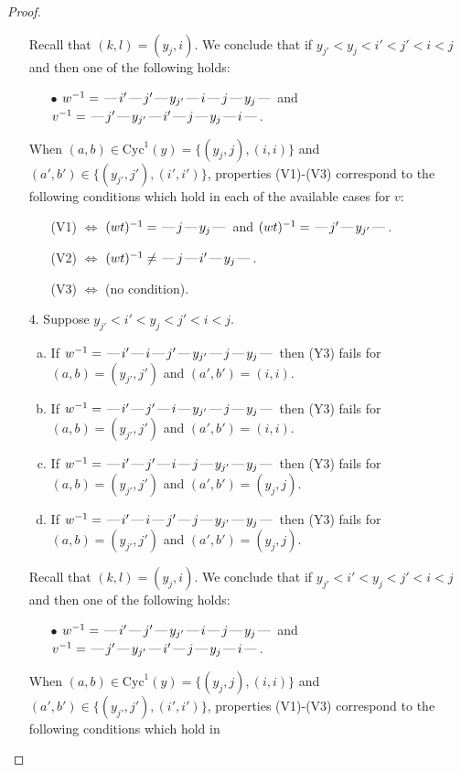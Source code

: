 \documentclass[10pt]{article}
\theoremstyle{definition}
\theoremstyle{definition}
\def\dash{\text{\hspace{0.5mm}---\hspace{0.5mm}}}
\def\Cyc{\mathrm{Cyc}}
\begin{document}
\begin{proof}
\begin{enumerate}
Recall that $(k,l) = (y_j,i)$.
We conclude that if $y_{j'} < y_j < i' < j' < i < j$ and then one of the following holds:
\begin{enumerate}
\item[$\bullet$] $w^{-1} = \dash i'\dash j'\dash y_{j'}\dash i\dash j\dash y_j\dash $ and $v^{-1} = \dash j'\dash y_{j'}\dash i'\dash j\dash y_j\dash i\dash $.
\end{enumerate}
When $(a,b)\in\Cyc^1(y)=\{(y_j,j),(i,i)\}$ and $(a',b')\in\{(y_{j'},j'),(i',i')\}$,
properties (V1)-(V3) correspond to the following conditions which hold in
each of the available cases for $v$:
\begin{enumerate}
\item[](V1) $\Leftrightarrow$ $(wt)^{-1} = \dash j \dash y_j \dash$  and $(wt)^{-1} = \dash j' \dash y_{j'} \dash$.
\item[](V2) $\Leftrightarrow$ $(wt)^{-1} \neq \dash j \dash i' \dash y_j \dash$.
\item[](V3) $\Leftrightarrow$ (no condition).
\end{enumerate}
\item[$4$.] Suppose $y_{j'} < i' < y_j < j' < i < j$.
\begin{enumerate}[(a)]
\item If $w^{-1} = \dash i'\dash i\dash j'\dash y_{j'}\dash j\dash y_j\dash $ then (Y3) fails for $(a,b)=(y_{j'},j')$ and $(a',b')=(i,i)$.
\item If $w^{-1} = \dash i'\dash j'\dash i\dash y_{j'}\dash j\dash y_j\dash $ then (Y3) fails for $(a,b)=(y_{j'},j')$ and $(a',b')=(i,i)$.
\item If $w^{-1} = \dash i'\dash j'\dash i\dash j\dash y_{j'}\dash y_j\dash $ then (Y3) fails for $(a,b)=(y_{j'},j')$ and $(a',b')=(y_j,j)$.
\item If $w^{-1} = \dash i'\dash i\dash j'\dash j\dash y_{j'}\dash y_j\dash $ then (Y3) fails for $(a,b)=(y_{j'},j')$ and $(a',b')=(y_j,j)$.
\end{enumerate}
Recall that $(k,l) = (y_j,i)$.
We conclude that if $y_{j'} < i' < y_j < j' < i < j$ and then one of the following holds:
\begin{enumerate}
\item[$\bullet$] $w^{-1} = \dash i'\dash j'\dash y_{j'}\dash i\dash j\dash y_j\dash $ and $v^{-1} = \dash j'\dash y_{j'}\dash i'\dash j\dash y_j\dash i\dash $.
\end{enumerate}
When $(a,b)\in\Cyc^1(y)=\{(y_j,j),(i,i)\}$ and $(a',b')\in\{(y_{j'},j'),(i',i')\}$,
properties (V1)-(V3) correspond to the following conditions which hold in

\end{enumerate}
\end{proof}
\end{document}
